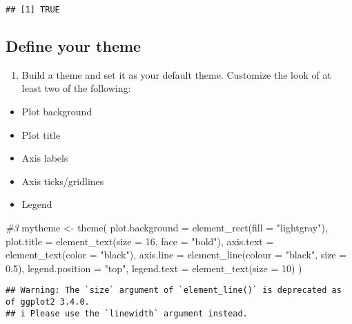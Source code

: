 \documentclass[
]{article}
\newenvironment{Shaded}{\begin{snugshade}}{\end{snugshade}}
\newcommand{\AttributeTok}[1]{\textcolor[rgb]{0.77,0.63,0.00}{#1}}
\newcommand{\CommentTok}[1]{\textcolor[rgb]{0.56,0.35,0.01}{\textit{#1}}}
\newcommand{\DecValTok}[1]{\textcolor[rgb]{0.00,0.00,0.81}{#1}}
\newcommand{\FloatTok}[1]{\textcolor[rgb]{0.00,0.00,0.81}{#1}}
\newcommand{\FunctionTok}[1]{\textcolor[rgb]{0.00,0.00,0.00}{#1}}
\newcommand{\NormalTok}[1]{#1}
\newcommand{\OtherTok}[1]{\textcolor[rgb]{0.56,0.35,0.01}{#1}}
\newcommand{\StringTok}[1]{\textcolor[rgb]{0.31,0.60,0.02}{#1}}
\providecommand{\tightlist}{%
  \setlength{\itemsep}{0pt}\setlength{\parskip}{0pt}}
\begin{document}
\begin{verbatim}
## [1] TRUE
\end{verbatim}

\hypertarget{define-your-theme}{%
\subsection{Define your theme}\label{define-your-theme}}

\begin{enumerate}
\def\labelenumi{\arabic{enumi}.}
\setcounter{enumi}{2}
\tightlist
\item
  Build a theme and set it as your default theme. Customize the look of
  at least two of the following:
\end{enumerate}

\begin{itemize}
\tightlist
\item
  Plot background
\item
  Plot title
\item
  Axis labels
\item
  Axis ticks/gridlines
\item
  Legend
\end{itemize}

\begin{Shaded}
\begin{Highlighting}[]
\CommentTok{\#3}
\NormalTok{mytheme }\OtherTok{\textless{}{-}} \FunctionTok{theme}\NormalTok{(}
        \AttributeTok{plot.background =} \FunctionTok{element\_rect}\NormalTok{(}\AttributeTok{fill =} \StringTok{"lightgray"}\NormalTok{),}
        \AttributeTok{plot.title =} \FunctionTok{element\_text}\NormalTok{(}\AttributeTok{size =} \DecValTok{16}\NormalTok{, }\AttributeTok{face =} \StringTok{"bold"}\NormalTok{),}
        \AttributeTok{axis.text =} \FunctionTok{element\_text}\NormalTok{(}\AttributeTok{color =} \StringTok{"black"}\NormalTok{), }
        \AttributeTok{axis.line =} \FunctionTok{element\_line}\NormalTok{(}\AttributeTok{colour =} \StringTok{"black"}\NormalTok{, }\AttributeTok{size =} \FloatTok{0.5}\NormalTok{),}
        \AttributeTok{legend.position =} \StringTok{"top"}\NormalTok{,}
        \AttributeTok{legend.text =} \FunctionTok{element\_text}\NormalTok{(}\AttributeTok{size =} \DecValTok{10}\NormalTok{)}
\NormalTok{        )}
\end{Highlighting}
\end{Shaded}

\begin{verbatim}
## Warning: The `size` argument of `element_line()` is deprecated as of ggplot2 3.4.0.
## i Please use the `linewidth` argument instead.
\end{verbatim}
\end{document}
